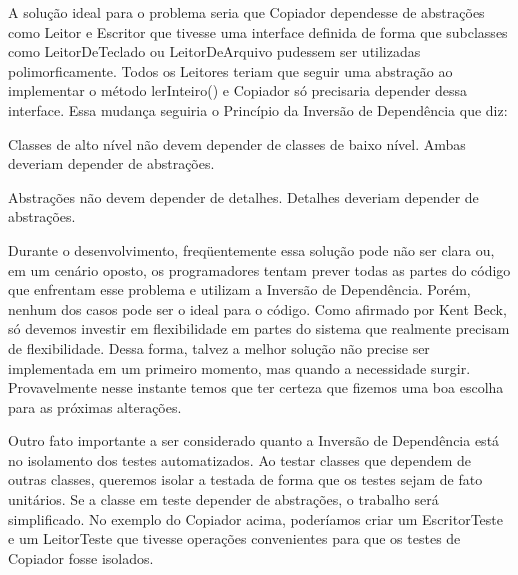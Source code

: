 	A solução ideal para o problema seria que Copiador dependesse de abstrações como Leitor e Escritor que tivesse uma interface definida de forma que subclasses como LeitorDeTeclado ou LeitorDeArquivo pudessem ser utilizadas polimorficamente. Todos os Leitores teriam que seguir uma abstração ao implementar o método lerInteiro() e Copiador só precisaria depender dessa interface. Essa mudança seguiria o Princípio da Inversão de Dependência que diz:
	
Classes de alto nível não devem depender de classes de baixo nível. Ambas deveriam depender de abstrações.

Abstrações não devem depender de detalhes. Detalhes deveriam depender de abstrações.

	Durante o desenvolvimento, freqüentemente essa solução pode não ser clara ou, em um cenário oposto, os programadores tentam prever todas as partes do código que enfrentam esse problema e utilizam a Inversão de Dependência. Porém, nenhum dos casos pode ser o ideal para o código. Como afirmado por Kent Beck, só devemos investir em flexibilidade em partes do sistema que realmente precisam de flexibilidade. Dessa forma, talvez a melhor solução não precise ser implementada em um primeiro momento, mas quando a necessidade surgir. Provavelmente nesse instante temos que ter certeza que fizemos uma boa escolha para as próximas alterações.
	
	Outro fato importante a ser considerado quanto a Inversão de Dependência está no isolamento dos testes automatizados. Ao testar classes que dependem de outras classes, queremos isolar a testada de forma que os testes sejam de fato unitários. Se a classe em teste depender de abstrações, o trabalho será simplificado. No exemplo do Copiador acima, poderíamos criar um EscritorTeste e um LeitorTeste que tivesse operações convenientes para que os testes de Copiador fosse isolados.

